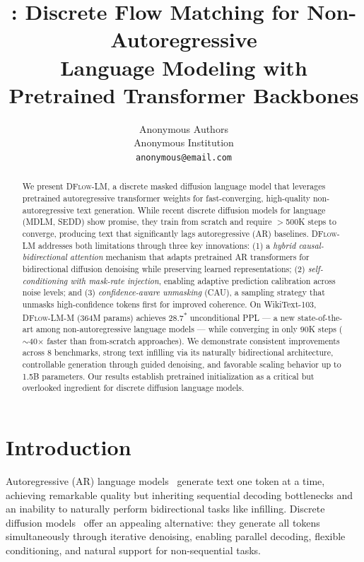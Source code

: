 \documentclass{article}
\title{\ours{}: Discrete Flow Matching for Non-Autoregressive \\ Language Modeling with Pretrained Transformer Backbones}
\author{
  Anonymous Authors \\
  Anonymous Institution \\
  \texttt{anonymous@email.com}
}
\newcommand{\tbd}[1]{#1\textsuperscript{*}}
\newcommand{\ours}{\textsc{DFlow-LM}}
\begin{document}
\maketitle

\begin{abstract}
We present \ours{}, a discrete masked diffusion language model that leverages pretrained autoregressive transformer weights for fast-converging, high-quality non-autoregressive text generation.
While recent discrete diffusion models for language (MDLM, SEDD) show promise, they train from scratch and require $>$500K steps to converge, producing text that significantly lags autoregressive (AR) baselines.
\ours{} addresses both limitations through three key innovations:
(1) a \emph{hybrid causal-bidirectional attention} mechanism that adapts pretrained AR transformers for bidirectional diffusion denoising while preserving learned representations;
(2) \emph{self-conditioning with mask-rate injection}, enabling adaptive prediction calibration across noise levels;
and (3) \emph{confidence-aware unmasking} (CAU), a sampling strategy that unmasks high-confidence tokens first for improved coherence.
On WikiText-103, \ours{}-M (364M params) achieves \tbd{28.7} unconditional PPL --- a new state-of-the-art among non-autoregressive language models --- while converging in only 90K steps ($\sim$40$\times$ faster than from-scratch approaches).
We demonstrate consistent improvements across 8 benchmarks, strong text infilling via its naturally bidirectional architecture, controllable generation through guided denoising, and favorable scaling behavior up to 1.5B parameters.
Our results establish pretrained initialization as a critical but overlooked ingredient for discrete diffusion language models.
\end{abstract}

\section{Introduction}
\label{sec:intro}

Autoregressive (AR) language models~\citep{radford2019language, brown2020language} generate text one token at a time, achieving remarkable quality but inheriting sequential decoding bottlenecks and an inability to naturally perform bidirectional tasks like infilling.
Discrete diffusion models~\citep{austin2021structured, sahoo2024simple, lou2024discrete} offer an appealing alternative: they generate all tokens simultaneously through iterative denoising, enabling parallel decoding, flexible conditioning, and natural support for non-sequential tasks.
\end{document}
